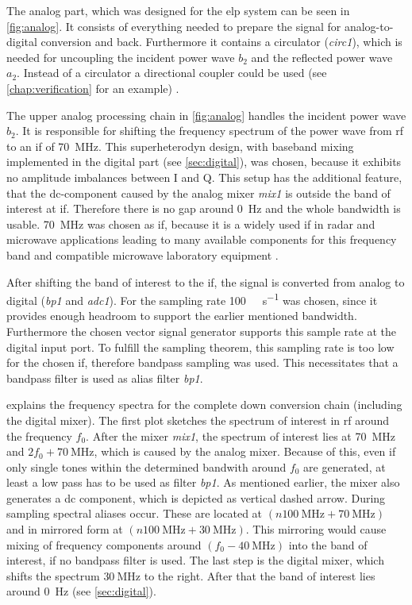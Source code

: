 \documentclass[12pt,a4paper,parskip=full,abstract=true,BCOR=10mm,twoside,open=right]{scrreprt}
\def\device#1{\textit{#1}}
\begin{document}
The analog part, which was designed for the \gls{elp} system can be seen in
\cref{fig:analog}. It consists of everything needed to prepare the signal
for analog-to-digital conversion and back. Furthermore it contains a
circulator (\device{circ1}), which is needed for uncoupling the
incident power wave $b_2$ and the reflected power wave $a_2$. Instead of a
circulator a directional coupler could be used (see
\cref{chap:verification} for an example) \cite{ghannouchi_load-pull_2013}.

The upper analog processing chain in \cref{fig:analog} handles the
incident power wave $b_2$. It is responsible for shifting the frequency spectrum
of the power wave from \gls{rf} to an \gls{if} of \SI{70}{\mega\hertz}. This
superheterodyn design, with baseband mixing implemented in the digital
part (see \cref{sec:digital}), was chosen, because it exhibits no amplitude
imbalances between I and Q. This setup has the additional feature, that
the \gls{dc}-component caused by the analog mixer \device{mix1} is outside the
band of interest at \gls{if}. Therefore there is no gap around \SI{0}{\hertz}
and the whole bandwidth is usable. \SI{70}{\mega\hertz} was chosen as \gls{if},
because it is a widely used \gls{if} in radar and microwave applications
\cite{tozer_broadcast_2004,ahamed_design_1997,whitaker_rf_2002,penttinen_telecommunications_2015}
leading to many available components for this frequency band and compatible microwave
laboratory equipment \cite{agilent_h70}.

After shifting the band of interest to the \gls{if}, the signal is converted from
analog to digital (\device{bp1} and \device{adc1}). For the sampling rate
\SI{100}{\mega\samples\per\second} was chosen, since it provides enough headroom to
support the earlier mentioned bandwidth. Furthermore the chosen vector signal generator supports this sample rate
at the digital input port. To fulfill the sampling theorem, this sampling rate is too low for the chosen
\gls{if}, therefore bandpass sampling was used. This necessitates that a bandpass
filter is used as alias filter \device{bp1}.

 explains the frequency spectra for the complete down
conversion chain (including the digital mixer). The first plot sketches the
spectrum of interest in \gls{rf} around the frequency $f_0$. After the mixer \device{mix1}, the
spectrum of interest lies at \SI{70}{\mega\hertz} and $2f_0 + \SI{70}{\mega\hertz}$,
which is caused by the analog mixer. Because of this, even if only single tones
within the determined bandwith around $f_0$ are generated, at least a low pass
has to be used as filter \device{bp1}. As mentioned earlier, the mixer also generates a \gls{dc} component, which is depicted as vertical dashed arrow. During sampling spectral aliases occur. These
are located at $(n \SI{100}{\mega\hertz} + \SI{70}{\mega\hertz})$ and in mirrored form at
$(n \SI{100}{\mega\hertz} + \SI{30}{\mega\hertz})$. This mirroring would cause mixing
of frequency components around $(f_0 - \SI{40}{\mega\hertz})$ into the band of interest,
if no bandpass filter is used. The last step is the digital mixer, which shifts
the spectrum $\SI{30}{\mega\hertz}$ to the right. After that the band of interest lies around
\SI{0}{\hertz} (see \cref{sec:digital}).
\end{document}
